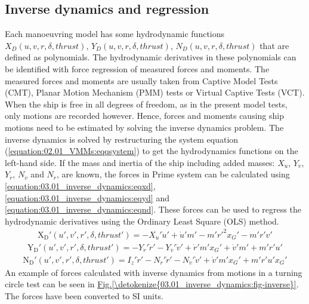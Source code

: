 \subsection{Inverse dynamics and regression}
\label{\detokenize{03.01_inverse_dynamics:inverse-dynamics-and-regression}}\label{\detokenize{03.01_inverse_dynamics::doc}}
\sphinxAtStartPar
Each manoeuvring model has some hydrodynamic functions \(X_D(u,v,r,\delta,thrust)\), \(Y_D(u,v,r,\delta,thrust)\), \(N_D(u,v,r,\delta,thrust)\) that are defined as polynomials. The hydrodynamic derivatives in these polynomials can be identified with force regression of measured forces and moments. The measured forces and moments are usually taken from Captive Model Tests (CMT), Planar Motion Mechanism (PMM) tests or Virtual Captive Tests (VCT). When the ship is free in all degrees of freedom, as in the present model tests, only
motions are recorded however. Hence, forces and moments causing ship motions need to be estimated by
solving the inverse dynamics problem.
The inverse dynamics is solved by restructuring the system equation (\autoref{equation:02.01_VMMs:eqqsystem}) to get the hydrodynamics functions on the left-hand side. If the mass and inertia of the ship including added masses: \(X_{\dot{u}}\), \(Y_{\dot{v}}\), \(Y_{\dot{r}}\), \(N_{\dot{v}}\) and \(N_{\dot{r}}\), are known, the forces in Prime system can be calculated using \autoref{equation:03.01_inverse_dynamics:eqxd}, \autoref{equation:03.01_inverse_dynamics:eqyd} and \autoref{equation:03.01_inverse_dynamics:eqnd}.
These forces can be used to regress the hydrodynamic derivatives using the Ordinary Least Square (OLS) method. 
\begin{equation}\label{equation:03.01_inverse_dynamics:eqxd}
\begin{split}\displaystyle \operatorname{X_{D}'}{\left(u',v',r',\delta,thrust' \right)} = - X_{\dot{u}}' \dot{u}' + \dot{u}' m' - m' r'^{2} x_{G}' - m' r' v'\end{split}
\end{equation}\begin{equation}\label{equation:03.01_inverse_dynamics:eqyd}
\begin{split}\displaystyle \operatorname{Y_{D}'}{\left(u',v',r',\delta,thrust' \right)} = - Y_{\dot{r}}' \dot{r}' - Y_{\dot{v}}' \dot{v}' + \dot{r}' m' x_{G}' + \dot{v}' m' + m' r' u'\end{split}
\end{equation}\begin{equation}\label{equation:03.01_inverse_dynamics:eqnd}
\begin{split}\displaystyle \operatorname{N_{D}'}{\left(u',v',r',\delta,thrust' \right)} = I_{z}' \dot{r}' - N_{\dot{r}}' \dot{r}' - N_{\dot{v}}' \dot{v}' + \dot{v}' m' x_{G}' + m' r' u' x_{G}'\end{split}
\end{equation}
\sphinxAtStartPar
An example of forces calculated with inverse dynamics from motions in a turning circle test can be seen in \hyperref[\detokenize{03.01_inverse_dynamics:fig-inverse}]{Fig.\@ \ref{\detokenize{03.01_inverse_dynamics:fig-inverse}}}. The forces have been converted to SI units.


